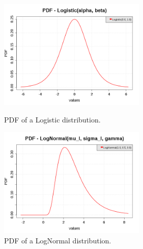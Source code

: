 \begin{figure}[H]
  \begin{minipage}{10cm}
    \begin{center}
      \includegraphics[width=7cm]{pdf_Logistic.png}
      \caption{PDF of a Logistic distribution.}
      \label{PDFLogistic}
    \end{center}
  \end{minipage}
  \hfill
  \begin{minipage}{10cm}
    \begin{center}
      \includegraphics[width=7cm]{pdf_LogNormal.png}
      \caption{PDF of a  LogNormal distribution.}
      \label{PDFLogNormal}
    \end{center}
  \end{minipage}
\end{figure}






